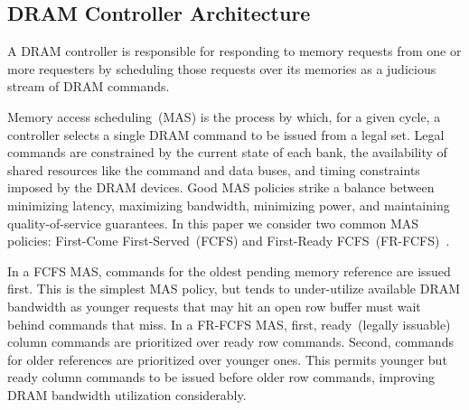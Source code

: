 \subsection{DRAM Controller Architecture}\label{sec:dram-mas}
A DRAM controller is responsible for responding to memory
requests from one or more requesters by scheduling those requests over its
memories as a judicious stream of DRAM commands.

Memory access scheduling~(MAS) is the process by which, for a given cycle, a
controller selects a single DRAM command to be issued from a legal set. Legal
commands are constrained by the current state of each bank, the availability of
shared resources like the command and data buses, and timing constraints
imposed by the DRAM devices. Good MAS policies strike a balance
between minimizing latency, maximizing bandwidth, minimizing power, and
maintaining quality-of-service guarantees. In this paper we consider two common
MAS policies: First-Come First-Served~(FCFS) and First-Ready
FCFS~(FR-FCFS)~\cite{frfcfs}.

In a FCFS MAS, commands for the oldest pending memory reference are issued
first. This is the simplest MAS policy, but tends to under-utilize available
DRAM bandwidth as younger requests that may hit an open row buffer must wait
behind commands that miss. In a FR-FCFS MAS, first, ready~(legally issuable) column
commands are prioritized over ready row commands. Second, commands for older
references are prioritized over younger ones. This permits younger but ready
column commands to be issued before older row commands, improving DRAM bandwidth
utilization considerably.


